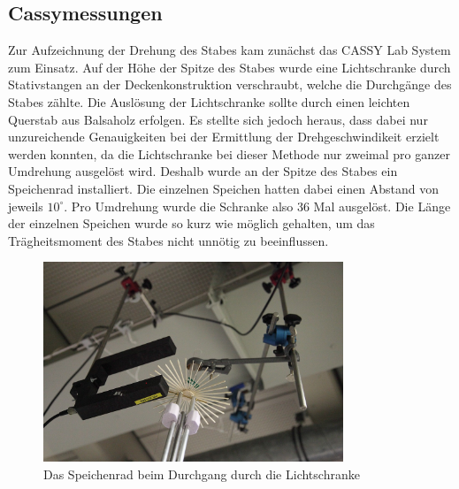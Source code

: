 \documentclass[11pt]{scrartcl}
\begin{document}
\subsection{Cassymessungen} %
Zur Aufzeichnung der Drehung des Stabes kam zun\"achst das CASSY Lab System zum Einsatz. Auf der H\"ohe der Spitze des Stabes wurde eine Lichtschranke durch Stativstangen an der Deckenkonstruktion verschraubt, welche die Durchg\"ange des Stabes z\"ahlte. Die Ausl\"osung der Lichtschranke sollte durch einen leichten Querstab aus Balsaholz erfolgen. Es stellte sich jedoch heraus, dass dabei nur unzureichende Genauigkeiten bei der Ermittlung der Drehgeschwindikeit erzielt werden konnten, da die Lichtschranke bei dieser Methode nur zweimal pro ganzer Umdrehung ausgel\"ost wird. Deshalb wurde an der Spitze des Stabes ein \glqq Speichenrad\grqq{} installiert. Die einzelnen Speichen hatten dabei einen Abstand von jeweils $10^\circ$. Pro Umdrehung wurde die Schranke also 36 Mal ausgel\"ost. Die L\"ange der einzelnen Speichen wurde so kurz wie m\"oglich gehalten, um das Tr\"agheitsmoment des Stabes nicht unn\"otig zu beeinflussen.
\begin{figure}[ht]
\begin{center}
\includegraphics[width=0.8\textwidth]{lichtschranke.jpg}
\end{center}
\vspace{-1.5\baselineskip}
\caption{Das Speichenrad beim Durchgang durch die Lichtschranke}
\label{lichtschranke}
\end{figure}
\end{document}
